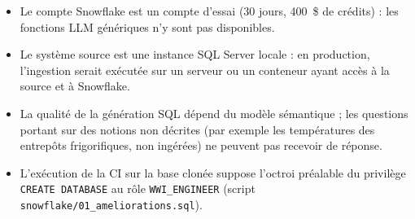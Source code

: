 \begin{itemize}
  \item Le compte Snowflake est un compte d'essai (30 jours, 400~\$ de crédits) : les fonctions LLM
        génériques n'y sont pas disponibles.
  \item Le système source est une instance SQL Server locale : en production, l'ingestion serait
        exécutée sur un serveur ou un conteneur ayant accès à la source et à Snowflake.
  \item La qualité de la génération SQL dépend du modèle sémantique ; les questions portant sur des
        notions non décrites (par exemple les températures des entrepôts frigorifiques, non ingérées)
        ne peuvent pas recevoir de réponse.
  \item L'exécution de la CI sur la base clonée suppose l'octroi préalable du privilège
        \texttt{CREATE DATABASE} au rôle \texttt{WWI\_ENGINEER} (script
        \texttt{snowflake/01\_ameliorations.sql}).
\end{itemize}
